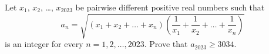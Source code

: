 Let $x_1$, $x_2$, \dots, $x_{2023}$ be pairwise different positive real numbers such that
\[ a_n = \sqrt{(x_1+x_2+\dots+x_n)
  \left(\frac{1}{x_1}+\frac{1}{x_2}+\dots+\frac{1}{x_n}\right)} \]
is an integer for every $n=1,2,\dots,2023$. Prove that $a_{2023} \geq 3034$.